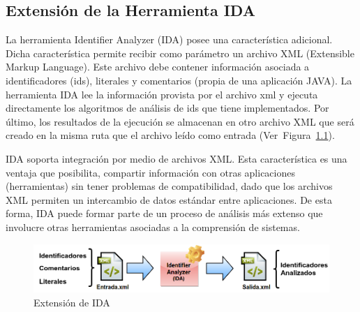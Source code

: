 \begin{appendices}

\chapter{}

\enlargethispage{\baselineskip}
\section{Extensión de la Herramienta IDA}

La herramienta Identifier Analyzer (IDA) posee una característica adicional. Dicha característica permite recibir como parámetro un archivo XML
(Extensible Markup Language). Este archivo debe contener información asociada a identificadores (ids), literales y comentarios (propia de una aplicación JAVA).
La herramienta IDA lee la información provista por el archivo xml y ejecuta directamente los algoritmos de análisis de ids que tiene implementados. Por último, los resultados de la ejecución se almacenan en otro archivo XML que será creado en la misma ruta que el archivo leído como entrada \mbox{(Ver Figura \ref{arq1}).}

IDA soporta integración por medio de archivos XML. Esta característica es una ventaja que posibilita, compartir información con otras aplicaciones (herramientas) sin tener problemas de compatibilidad, dado que los archivos XML permiten un intercambio de datos estándar entre aplicaciones. De esta forma, IDA puede formar parte de un proceso de análisis más extenso que involucre otras herramientas asociadas a la comprensión de sistemas.

\vspace{-0.5em}

\begin{figure}[h!] %
\centerline{%
\includegraphics[scale= 0.57]{./ape/ape_01.png}
}
\caption{Extensión de IDA}
\label{arq1}
\end{figure}



\end{appendices}
